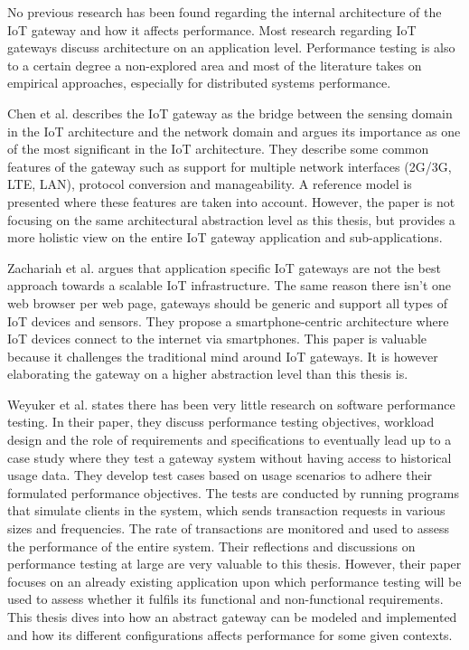 No previous research has been found regarding the internal architecture of the
IoT gateway and how it affects performance. Most research regarding IoT
gateways discuss architecture on an application level. Performance testing is
also to a certain degree a non-explored area and most of the literature takes
on empirical approaches, especially for distributed systems performance.

Chen et al. \cite{chen2011brief} describes the IoT gateway as the bridge
between the sensing domain in the IoT architecture and the network domain and
argues its importance as one of the most significant in the IoT architecture.
They describe some common features of the gateway such as support for multiple
network interfaces (2G/3G, LTE, LAN), protocol conversion and manageability. A
reference model is presented where these features are taken into account.
However, the paper is not focusing on the same architectural abstraction level
as this thesis, but provides a more holistic view on the entire IoT gateway
application and sub-applications.

Zachariah et al. \cite{zachariah2015internet} argues that application specific
IoT gateways are not the best approach towards a scalable IoT infrastructure.
The same reason there isn't one web browser per web page, gateways should be
generic and support all types of IoT devices and sensors. They propose a
smartphone-centric architecture where IoT devices connect to the internet via
smartphones. This paper is valuable because it challenges the traditional mind
around IoT gateways. It is however elaborating the gateway on a higher
abstraction level than this thesis is.

Weyuker et al. \cite{weyuker2000experience} states there has been very little
research on software performance testing. In their paper, they discuss
performance testing objectives, workload design and the role of requirements
and specifications to eventually lead up to a case study where they test a
gateway system without having access to historical usage data. They develop
test cases based on usage scenarios to adhere their formulated performance
objectives. The tests are conducted by running programs that simulate clients
in the system, which sends transaction requests in various sizes and
frequencies. The rate of transactions are monitored and used to assess the
performance of the entire system. Their reflections and discussions on
performance testing at large are very valuable to this thesis. However, their
paper focuses on an already existing application upon which performance testing
will be used to assess whether it fulfils its functional and non-functional
requirements. This thesis dives into how an abstract gateway can be modeled and
implemented and how its different configurations affects performance for some
given contexts.

